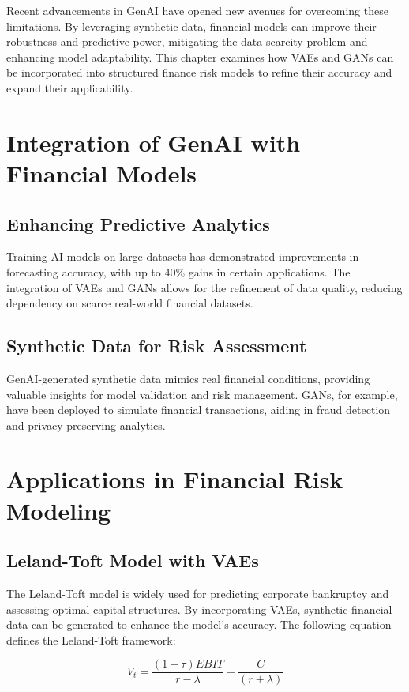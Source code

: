 \documentclass[a4paper,headinclude=on,footinclude=on,12pt,oneside]{scrbook}
\begin{document}
Recent advancements in GenAI have opened new avenues for overcoming these limitations. By leveraging synthetic data, financial models can improve their robustness and predictive power, mitigating the data scarcity problem and enhancing model adaptability. This chapter examines how VAEs and GANs can be incorporated into structured finance risk models to refine their accuracy and expand their applicability.

\section{Integration of GenAI with Financial Models}

\subsection{Enhancing Predictive Analytics}
Training AI models on large datasets has demonstrated improvements in forecasting accuracy, with up to 40\% gains in certain applications. The integration of VAEs and GANs allows for the refinement of data quality, reducing dependency on scarce real-world financial datasets.

\subsection{Synthetic Data for Risk Assessment}
GenAI-generated synthetic data mimics real financial conditions, providing valuable insights for model validation and risk management. GANs, for example, have been deployed to simulate financial transactions, aiding in fraud detection and privacy-preserving analytics.

\section{Applications in Financial Risk Modeling}

\subsection{Leland-Toft Model with VAEs}
The Leland-Toft model is widely used for predicting corporate bankruptcy and assessing optimal capital structures. By incorporating VAEs, synthetic financial data can be generated to enhance the model’s accuracy. The following equation defines the Leland-Toft framework:

\begin{equation}
	V_t = \frac{(1 - \tau) EBIT}{r - \lambda} - \frac{C}{(r + \lambda)}
\end{equation}
\end{document}
